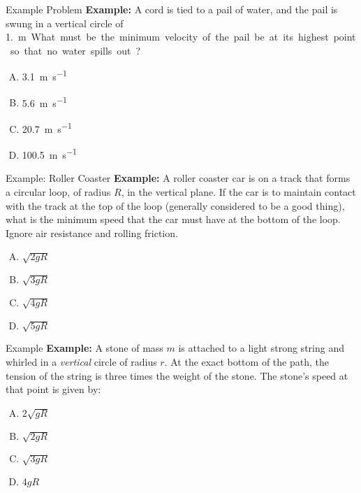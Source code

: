 \documentclass[12pt,compress,aspectratio=169]{beamer}
\begin{document}
\begin{frame}{Example Problem}
  \textbf{Example:} A cord is tied to a pail of water, and the pail is swung
  in a vertical circle of \SI{1.}\metre. What must be the minimum velocity of
  the pail be at its highest point so that no water spills out?
  \begin{enumerate}[(A)]
  \item\SI{3.1}{\metre\per\second}
  \item\SI{5.6}{\metre\per\second}
  \item\SI{20.7}{\metre\per\second}
  \item\SI{100.5}{\metre\per\second}
  \end{enumerate}
\end{frame}



\begin{frame}{Example: Roller Coaster}
  \textbf{Example:} A roller coaster car is on a track that forms a circular
  loop, of radius $R$, in the vertical plane. If the car is to maintain contact
  with the track at the top of the loop (generally considered to be a good
  thing), what is the minimum speed that the car must have at the bottom of the
  loop. Ignore air resistance and rolling friction.
  \begin{enumerate}[(A)]
  \item $\sqrt{2gR}$
  \item $\sqrt{3gR}$
  \item $\sqrt{4gR}$
  \item $\sqrt{5gR}$
  \end{enumerate}
\end{frame}



\begin{frame}{Example}
  \textbf{Example:} A stone of mass $m$ is attached to a light strong string
  and whirled in a \emph{vertical} circle of radius $r$. At the exact bottom of
  the path, the tension of the string is three times the weight of the stone.
  The stone's speed at that point is given by:
  \begin{enumerate}[(A)]
  \item $2\sqrt{gR}$
  \item $\sqrt{2gR}$
  \item $\sqrt{3gR}$
  \item $4gR$
  \end{enumerate}
\end{frame}
\end{document}
